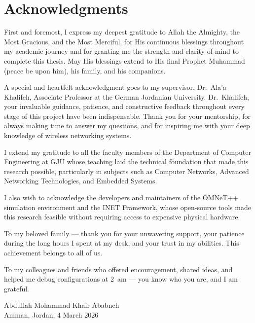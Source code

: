 \chapter*{Acknowledgments}

First and foremost, I express my deepest gratitude to Allah the Almighty, the Most
Gracious, and the Most Merciful, for His continuous blessings throughout my academic
journey and for granting me the strength and clarity of mind to complete this thesis. May
His blessings extend to His final Prophet Muhammad (peace be upon him), his family,
and his companions.

A special and heartfelt acknowledgment goes to my supervisor, Dr.\ Ala'a Khalifeh,
Associate Professor at the German Jordanian University. Dr.\ Khalifeh, your invaluable
guidance, patience, and constructive feedback throughout every stage of this project have
been indispensable. Thank you for your mentorship, for always making time to answer my
questions, and for inspiring me with your deep knowledge of wireless networking systems.

I extend my gratitude to all the faculty members of the Department of Computer
Engineering at GJU whose teaching laid the technical foundation that made this research
possible, particularly in subjects such as Computer Networks, Advanced Networking
Technologies, and Embedded Systems.

I also wish to acknowledge the developers and maintainers of the OMNeT++ simulation
environment and the INET Framework, whose open-source tools made this research
feasible without requiring access to expensive physical hardware.

To my beloved family --- thank you for your unwavering support, your patience during
the long hours I spent at my desk, and your trust in my abilities. This achievement
belongs to all of us.

To my colleagues and friends who offered encouragement, shared ideas, and helped me
debug configurations at 2~am --- you know who you are, and I am grateful.

\vspace{1.5cm}
\begin{flushright}
Abdullah Mohammad Khair Ababneh\\
Amman, Jordan, 4 March 2026
\end{flushright}

\newpage
